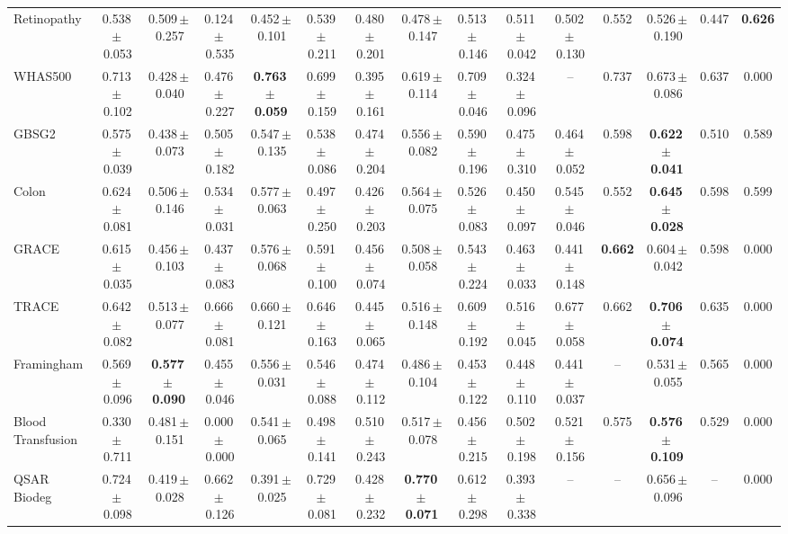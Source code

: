 \documentclass[8pt]{extarticle}
\begin{document}
\begin{longtable}{l*{14}{c}}
Retinopathy & 0.538\,$\pm$\,0.053 & 0.509\,$\pm$\,0.257 & 0.124\,$\pm$\,0.535 & 0.452\,$\pm$\,0.101 & 0.539\,$\pm$\,0.211 & 0.480\,$\pm$\,0.201 & 0.478\,$\pm$\,0.147 & 0.513\,$\pm$\,0.146 & 0.511\,$\pm$\,0.042 & 0.502\,$\pm$\,0.130 & 0.552 & 0.526\,$\pm$\,0.190 & 0.447 & \textbf{0.626} \\
WHAS500 & 0.713\,$\pm$\,0.102 & 0.428\,$\pm$\,0.040 & 0.476\,$\pm$\,0.227 & \textbf{0.763\,$\pm$\,0.059} & 0.699\,$\pm$\,0.159 & 0.395\,$\pm$\,0.161 & 0.619\,$\pm$\,0.114 & 0.709\,$\pm$\,0.046 & 0.324\,$\pm$\,0.096 & -- & 0.737 & 0.673\,$\pm$\,0.086 & 0.637 & 0.000 \\
GBSG2 & 0.575\,$\pm$\,0.039 & 0.438\,$\pm$\,0.073 & 0.505\,$\pm$\,0.182 & 0.547\,$\pm$\,0.135 & 0.538\,$\pm$\,0.086 & 0.474\,$\pm$\,0.204 & 0.556\,$\pm$\,0.082 & 0.590\,$\pm$\,0.196 & 0.475\,$\pm$\,0.310 & 0.464\,$\pm$\,0.052 & 0.598 & \textbf{0.622\,$\pm$\,0.041} & 0.510 & 0.589 \\
Colon & 0.624\,$\pm$\,0.081 & 0.506\,$\pm$\,0.146 & 0.534\,$\pm$\,0.031 & 0.577\,$\pm$\,0.063 & 0.497\,$\pm$\,0.250 & 0.426\,$\pm$\,0.203 & 0.564\,$\pm$\,0.075 & 0.526\,$\pm$\,0.083 & 0.450\,$\pm$\,0.097 & 0.545\,$\pm$\,0.046 & 0.552 & \textbf{0.645\,$\pm$\,0.028} & 0.598 & 0.599 \\
GRACE & 0.615\,$\pm$\,0.035 & 0.456\,$\pm$\,0.103 & 0.437\,$\pm$\,0.083 & 0.576\,$\pm$\,0.068 & 0.591\,$\pm$\,0.100 & 0.456\,$\pm$\,0.074 & 0.508\,$\pm$\,0.058 & 0.543\,$\pm$\,0.224 & 0.463\,$\pm$\,0.033 & 0.441\,$\pm$\,0.148 & \textbf{0.662} & 0.604\,$\pm$\,0.042 & 0.598 & 0.000 \\
TRACE & 0.642\,$\pm$\,0.082 & 0.513\,$\pm$\,0.077 & 0.666\,$\pm$\,0.081 & 0.660\,$\pm$\,0.121 & 0.646\,$\pm$\,0.163 & 0.445\,$\pm$\,0.065 & 0.516\,$\pm$\,0.148 & 0.609\,$\pm$\,0.192 & 0.516\,$\pm$\,0.045 & 0.677\,$\pm$\,0.058 & 0.662 & \textbf{0.706\,$\pm$\,0.074} & 0.635 & 0.000 \\
Framingham & 0.569\,$\pm$\,0.096 & \textbf{0.577\,$\pm$\,0.090} & 0.455\,$\pm$\,0.046 & 0.556\,$\pm$\,0.031 & 0.546\,$\pm$\,0.088 & 0.474\,$\pm$\,0.112 & 0.486\,$\pm$\,0.104 & 0.453\,$\pm$\,0.122 & 0.448\,$\pm$\,0.110 & 0.441\,$\pm$\,0.037 & -- & 0.531\,$\pm$\,0.055 & 0.565 & 0.000 \\
Blood Transfusion & 0.330\,$\pm$\,0.711 & 0.481\,$\pm$\,0.151 & 0.000\,$\pm$\,0.000 & 0.541\,$\pm$\,0.065 & 0.498\,$\pm$\,0.141 & 0.510\,$\pm$\,0.243 & 0.517\,$\pm$\,0.078 & 0.456\,$\pm$\,0.215 & 0.502\,$\pm$\,0.198 & 0.521\,$\pm$\,0.156 & 0.575 & \textbf{0.576\,$\pm$\,0.109} & 0.529 & 0.000 \\
QSAR Biodeg & 0.724\,$\pm$\,0.098 & 0.419\,$\pm$\,0.028 & 0.662\,$\pm$\,0.126 & 0.391\,$\pm$\,0.025 & 0.729\,$\pm$\,0.081 & 0.428\,$\pm$\,0.232 & \textbf{0.770\,$\pm$\,0.071} & 0.612\,$\pm$\,0.298 & 0.393\,$\pm$\,0.338 & -- & -- & 0.656\,$\pm$\,0.096 & -- & 0.000 \\

\end{longtable}
\end{document}
